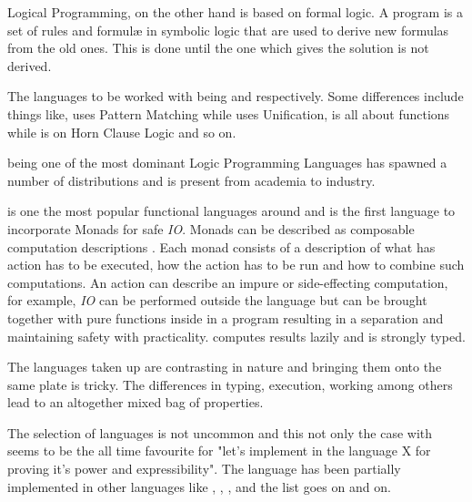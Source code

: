 \documentclass[thesis-solanki.tex]{subfiles}
\begin{document}
\par Logical Programming, \cite{spivey1995introduction} on the other hand is based on formal logic. A program is a 
set of rules and formul\ae{} in symbolic logic that are used to derive new formulas from the old ones. This is done 
until the one which gives the solution is not derived.  

\par The languages to be worked with being  and  respectively. Some 
differences include things like,  uses Pattern Matching while  uses 
Unification,  is all about functions while  is on Horn Clause Logic and so on.  

\par {} \cite{wikiprolog} being one of the most dominant Logic Programming Languages has 
spawned a number of distributions and is present from academia to industry.  

\par {} is one the most popular \cite{website:langpop} functional languages around and is the 
first language to incorporate Monads \cite{wadler1992comprehending} for safe \textit{IO}. Monads can be 
described as composable computation descriptions \cite{website:monadshaskellorg} . Each monad consists of a 
description of what has action has to be executed, how the action has to be run and how to combine such 
computations. An action can describe an impure or side-effecting computation, for example, \textit{IO} can be 
performed outside the language but can be brought together with pure functions inside in a program resulting in a 
separation and maintaining safety with practicality.  computes results lazily and is strongly 
typed. 

\par The languages taken up are contrasting in nature and bringing them onto the same plate is tricky. The 
differences in typing, execution, working among others lead to an altogether mixed bag of properties.

\par The selection of languages is not uncommon and this not only the case with  seems 
to be the all time favourite for "let's implement  in the language X for proving it's power and 
expressibility". The  language has been partially implemented \cite{swipembedd} in other 
languages like  \cite{racklog},   
\cite{komorowski1982qlog,robinson1982loglisp,robinson1980loglisp},  \cite{wikiprolog, jlog}, 
 \cite{jscriptlog} and the list \cite{yieldprolog} goes on and on.    
\end{document}
